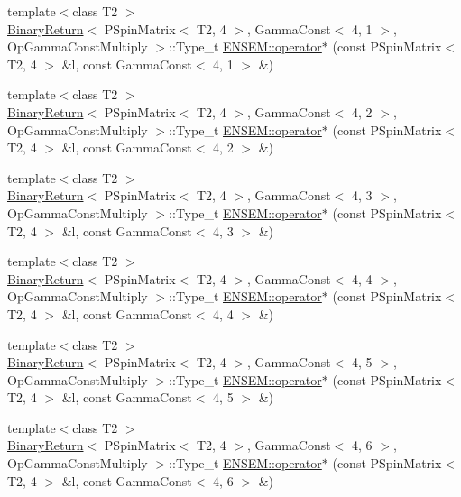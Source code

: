 \begin{DoxyCompactItemize}
\item 
{\footnotesize template$<$class T2 $>$ }\\\mbox{\hyperlink{structBinaryReturn}{Binary\+Return}}$<$ P\+Spin\+Matrix$<$ T2, 4 $>$, Gamma\+Const$<$ 4, 1 $>$, Op\+Gamma\+Const\+Multiply $>$\+::Type\+\_\+t \mbox{\hyperlink{group__primspinmatrix_gaf4a854dbb554a35d450e52f9edaae13e}{E\+N\+S\+E\+M\+::operator$\ast$}} (const P\+Spin\+Matrix$<$ T2, 4 $>$ \&l, const Gamma\+Const$<$ 4, 1 $>$ \&)
\item 
{\footnotesize template$<$class T2 $>$ }\\\mbox{\hyperlink{structBinaryReturn}{Binary\+Return}}$<$ P\+Spin\+Matrix$<$ T2, 4 $>$, Gamma\+Const$<$ 4, 2 $>$, Op\+Gamma\+Const\+Multiply $>$\+::Type\+\_\+t \mbox{\hyperlink{group__primspinmatrix_ga5a4c1e3861766e39bd44a3b7be45b5bb}{E\+N\+S\+E\+M\+::operator$\ast$}} (const P\+Spin\+Matrix$<$ T2, 4 $>$ \&l, const Gamma\+Const$<$ 4, 2 $>$ \&)
\item 
{\footnotesize template$<$class T2 $>$ }\\\mbox{\hyperlink{structBinaryReturn}{Binary\+Return}}$<$ P\+Spin\+Matrix$<$ T2, 4 $>$, Gamma\+Const$<$ 4, 3 $>$, Op\+Gamma\+Const\+Multiply $>$\+::Type\+\_\+t \mbox{\hyperlink{group__primspinmatrix_ga4489f67258a145c07f7805077699ec24}{E\+N\+S\+E\+M\+::operator$\ast$}} (const P\+Spin\+Matrix$<$ T2, 4 $>$ \&l, const Gamma\+Const$<$ 4, 3 $>$ \&)
\item 
{\footnotesize template$<$class T2 $>$ }\\\mbox{\hyperlink{structBinaryReturn}{Binary\+Return}}$<$ P\+Spin\+Matrix$<$ T2, 4 $>$, Gamma\+Const$<$ 4, 4 $>$, Op\+Gamma\+Const\+Multiply $>$\+::Type\+\_\+t \mbox{\hyperlink{group__primspinmatrix_gafa880313515ac76955c6c4de7513add3}{E\+N\+S\+E\+M\+::operator$\ast$}} (const P\+Spin\+Matrix$<$ T2, 4 $>$ \&l, const Gamma\+Const$<$ 4, 4 $>$ \&)
\item 
{\footnotesize template$<$class T2 $>$ }\\\mbox{\hyperlink{structBinaryReturn}{Binary\+Return}}$<$ P\+Spin\+Matrix$<$ T2, 4 $>$, Gamma\+Const$<$ 4, 5 $>$, Op\+Gamma\+Const\+Multiply $>$\+::Type\+\_\+t \mbox{\hyperlink{group__primspinmatrix_ga02ed9e6e920eca4f600dd06655fb2a42}{E\+N\+S\+E\+M\+::operator$\ast$}} (const P\+Spin\+Matrix$<$ T2, 4 $>$ \&l, const Gamma\+Const$<$ 4, 5 $>$ \&)
\item 
{\footnotesize template$<$class T2 $>$ }\\\mbox{\hyperlink{structBinaryReturn}{Binary\+Return}}$<$ P\+Spin\+Matrix$<$ T2, 4 $>$, Gamma\+Const$<$ 4, 6 $>$, Op\+Gamma\+Const\+Multiply $>$\+::Type\+\_\+t \mbox{\hyperlink{group__primspinmatrix_gaf04b1dbd5214d0a0e3a846a865a23f0e}{E\+N\+S\+E\+M\+::operator$\ast$}} (const P\+Spin\+Matrix$<$ T2, 4 $>$ \&l, const Gamma\+Const$<$ 4, 6 $>$ \&)

\end{DoxyCompactItemize}
